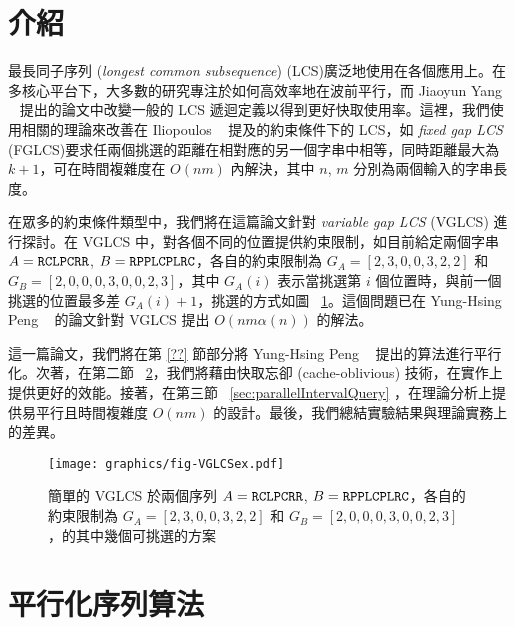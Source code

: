 \documentclass{gapd}
\begin{document}
\maketitle

\section{介紹} %
\label{sec:Introduction}

最長同子序列 (\emph{longest common subsequence}) (LCS)廣泛地使用在各個應用上。在多核心平台下，大多數的研究專注於如何高效率地在波前平行，而 Jiaoyun Yang ~\cite{jiaoyun} 提出的論文中改變一般的 LCS 遞迴定義以得到更好快取使用率。這裡，我們使用相關的理論來改善在 Iliopoulos ~\cite{iliopoulos} 提及的約束條件下的 LCS，如 \emph{fixed gap LCS } (FGLCS)要求任兩個挑選的距離在相對應的另一個字串中相等，同時距離最大為 $k+1$，可在時間複雜度在 $O(nm)$ 內解決，其中 $n$, $m$ 分別為兩個輸入的字串長度。

在眾多的約束條件類型中，我們將在這篇論文針對 \emph{variable gap LCS} (VGLCS) 進行探討。在 VGLCS 中，對各個不同的位置提供約束限制，如目前給定兩個字串 $A = \tt{RCLPCRR}$, $B = \tt{RPPLCPLRC}$，各自的約束限制為 $G_A = [2, 3, 0, 0, 3, 2, 2]$ 和 $G_B = [2, 0, 0, 0, 3, 0, 0, 2, 3]$，其中 $G_A(i)$ 表示當挑選第 $i$ 個位置時，與前一個挑選的位置最多差 $G_A(i)+1$，挑選的方式如圖 ~\ref{fig:VGLCSex}。這個問題已在 Yung-Hsing Peng ~\cite{yunghsing} 的論文針對 VGLCS 提出 $O(nm \alpha(n))$ 的解法。

這一篇論文，我們將在第 \ref{??} 節部分將 Yung-Hsing Peng ~\cite{yunghsing} 提出的算法進行平行化。次著，在第二節 ~\ref{sec:parallelSerial}，我們將藉由快取忘卻 (cache-oblivious) 技術，在實作上提供更好的效能。接著，在第三節 ~\ref{sec:parallelIntervalQuery} ，在理論分析上提供易平行且時間複雜度 $O(nm)$ 的設計。最後，我們總結實驗結果與理論實務上的差異。

\begin{figure}[!thb]
  \centering
  \texttt{[image: graphics/fig-VGLCSex.pdf]}
  \caption{簡單的 VGLCS 於兩個序列 $A = \tt{RCLPCRR}$, $B = \tt{RPPLCPLRC}$，各自的約束限制為 $G_A = [2, 3, 0, 0, 3, 2, 2]$ 和 $G_B = [2, 0, 0, 0, 3, 0, 0, 2, 3]$，的其中幾個可挑選的方案}
  \label{fig:VGLCSex}
\end{figure}

\section{平行化序列算法} %
\label{sec:parallelSerial}
\end{document}
